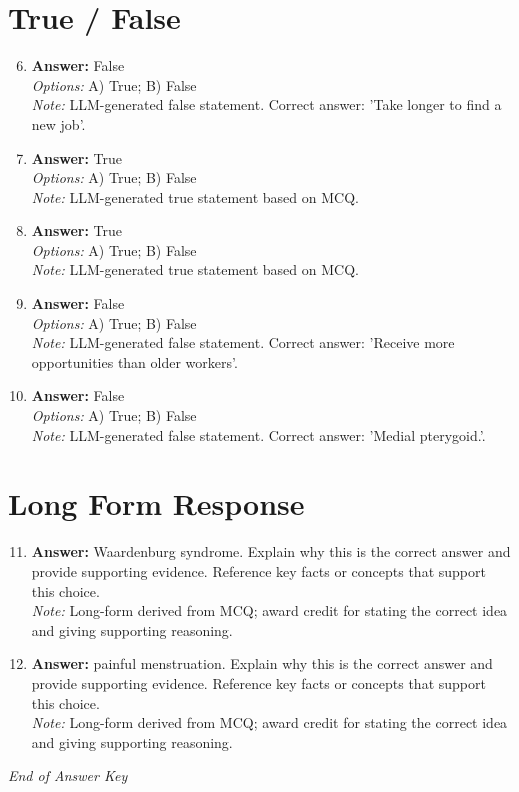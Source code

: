 \documentclass[12pt]{article}
\begin{document}
\section*{True / False}
\begin{enumerate}[label=\arabic*.]
\setcounter{enumi}{5}
\item \textbf{Answer:} False
\\ \textit{Options:} A) True; B) False
\\ \textit{Note:} LLM-generated false statement. Correct answer: 'Take longer to find a new job'.
\item \textbf{Answer:} True
\\ \textit{Options:} A) True; B) False
\\ \textit{Note:} LLM-generated true statement based on MCQ.
\item \textbf{Answer:} True
\\ \textit{Options:} A) True; B) False
\\ \textit{Note:} LLM-generated true statement based on MCQ.
\item \textbf{Answer:} False
\\ \textit{Options:} A) True; B) False
\\ \textit{Note:} LLM-generated false statement. Correct answer: 'Receive more opportunities than older workers'.
\item \textbf{Answer:} False
\\ \textit{Options:} A) True; B) False
\\ \textit{Note:} LLM-generated false statement. Correct answer: 'Medial pterygoid.'.
\end{enumerate}

\section*{Long Form Response}
\begin{enumerate}[label=\arabic*.]
\setcounter{enumi}{10}
\item \textbf{Answer:} Waardenburg syndrome. Explain why this is the correct answer and provide supporting evidence. Reference key facts or concepts that support this choice.
\\ \textit{Note:} Long-form derived from MCQ; award credit for stating the correct idea and giving supporting reasoning.
\item \textbf{Answer:} painful menstruation. Explain why this is the correct answer and provide supporting evidence. Reference key facts or concepts that support this choice.
\\ \textit{Note:} Long-form derived from MCQ; award credit for stating the correct idea and giving supporting reasoning.
\end{enumerate}

\vfill
\noindent\textit{End of Answer Key}
\end{document}
